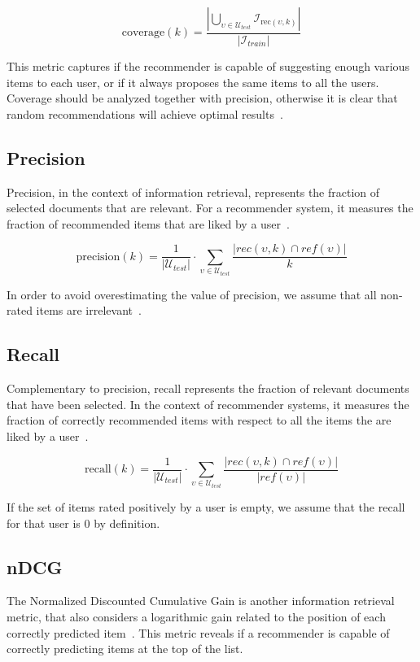 \begin{equation*}
\mathrm{coverage}(k) = \frac{|\bigcup_{\upsilon \in \mathcal{U}_{test}} \mathcal{I}_{\mathrm{rec}(\upsilon, k)}|}{|\mathcal{I}_{train}|}
\end{equation*}

This metric captures if the recommender is capable of suggesting enough various items to each user, or if it always proposes the same items to all the users. Coverage should be analyzed together with precision, otherwise it is clear that random recommendations will achieve optimal results~\cite{Herlocker2004}.

\subsection{Precision}
Precision, in the context of information retrieval, represents the fraction of selected documents that are relevant. For a recommender system, it measures the fraction of recommended items that are liked by a user~\cite{Sarwar2000}.

\begin{equation*}
\mathrm{precision}(k) = \frac{1}{|\mathcal{U}_{test}|} \cdot \sum_{\upsilon \in \mathcal{U}_{test}} \frac{|rec(\upsilon, k) \cap ref(\upsilon)|}{k}
\end{equation*}

In order to avoid overestimating the value of precision, we assume that all non-rated items are irrelevant~\cite{Steck2013}.

\subsection{Recall}
Complementary to precision, recall represents the fraction of relevant documents that have been selected. In the context of recommender systems, it measures the fraction of correctly recommended items with respect to all the items the are liked by a user~\cite{Sarwar2000}.

\begin{equation*}
\mathrm{recall}(k) = \frac{1}{|\mathcal{U}_{test}|} \cdot \sum_{\upsilon \in \mathcal{U}_{test}} \frac{|rec(\upsilon, k) \cap ref(\upsilon)|}{|ref(\upsilon)|}
\end{equation*}

If the set of items rated positively by a user is empty, we assume that the recall for that user is $0$ by definition.

\subsection{nDCG}
The Normalized Discounted Cumulative Gain is another information retrieval metric, that also considers a logarithmic gain related to the position of each correctly predicted item~\cite{Jaervelin2002}. This metric reveals if a recommender is capable of correctly predicting items at the top of the list.

